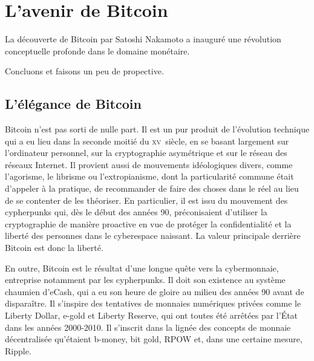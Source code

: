 
\chapter{L'avenir de Bitcoin} %
\label{ch:avenir}


La découverte de Bitcoin par Satoshi Nakamoto a inauguré une révolution conceptuelle profonde dans le domaine monétaire.

Concluons et faisons un peu de propective.

\section*{L'élégance de Bitcoin}


Bitcoin n'est pas sorti de nulle part. Il est un pur produit de l'évolution technique qui a eu lieu dans la seconde moitié du \textsc{xv}\ieme{}~siècle, en se basant largement sur l'ordinateur personnel, sur la cryptographie asymétrique et sur le réseau des réseaux Internet. Il provient aussi de mouvements idéologiques divers, comme l'agorisme, le librisme ou l'extropianisme, dont la particularité commune était d'appeler à la pratique, de recommander de faire des choses dans le réel au lieu de se contenter de les théoriser. En particulier, il est issu du mouvement des cypherpunks qui, dès le début des années 90, préconisaient d'utiliser la cryptographie de manière proactive en vue de protéger la confidentialité et la liberté des personnes dans le cyberespace naissant. La valeur principale derrière Bitcoin est donc la liberté.

En outre, Bitcoin est le résultat d'une longue quête vers la cybermonnaie, entreprise notamment par les cypherpunks. Il doit son existence au système chaumien d'eCash, qui a eu son heure de gloire au milieu des années 90 avant de disparaître. Il s'inspire des tentatives de monnaies numériques privées comme le Liberty Dollar, e-gold et Liberty Reserve, qui ont toutes été arrêtées par l'État dans les années 2000-2010. Il s'inscrit dans la lignée des concepts de monnaie décentralisée qu'étaient b-money, bit gold, RPOW et, dans une certaine mesure, Ripple.

